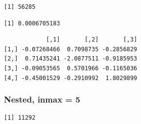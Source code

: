\documentclass[
  12pt,
  letterpaper,
  DIV=11,
  numbers=noendperiod]{scrartcl}
\newenvironment{Shaded}{\begin{snugshade}}{\end{snugshade}}
\newcommand{\AttributeTok}[1]{\textcolor[rgb]{0.40,0.45,0.13}{#1}}
\newcommand{\ConstantTok}[1]{\textcolor[rgb]{0.56,0.35,0.01}{#1}}
\newcommand{\DecValTok}[1]{\textcolor[rgb]{0.68,0.00,0.00}{#1}}
\newcommand{\FunctionTok}[1]{\textcolor[rgb]{0.28,0.35,0.67}{#1}}
\newcommand{\NormalTok}[1]{\textcolor[rgb]{0.00,0.23,0.31}{#1}}
\newcommand{\OtherTok}[1]{\textcolor[rgb]{0.00,0.23,0.31}{#1}}
\newcommand{\SpecialCharTok}[1]{\textcolor[rgb]{0.37,0.37,0.37}{#1}}
\begin{document}
\begin{verbatim}
[1] 56285
\end{verbatim}

\begin{Shaded}
\end{Shaded}

\begin{verbatim}
[1] 0.0006705183
\end{verbatim}

\begin{Shaded}
\end{Shaded}

\begin{verbatim}
            [,1]       [,2]       [,3]
[1,] -0.07268466  0.7098735 -0.2856829
[2,]  0.71435241 -2.0877511 -0.9185953
[3,] -0.09053565  0.5701966 -0.1165036
[4,] -0.45001529 -0.2910992  1.8029899
\end{verbatim}

\subsubsection{Nested, inmax = 5}\label{nested-inmax-5}

\begin{Shaded}
\end{Shaded}

\begin{verbatim}
[1] 11292
\end{verbatim}

\begin{Shaded}
\end{Shaded}
\end{document}
